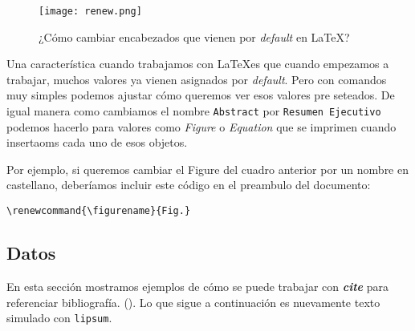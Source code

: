 









 \begin{figure}[H]  
  \centering 
    \texttt{[image: renew.png]}
  \caption{¿Cómo cambiar encabezados que vienen por \textit{default} en \LaTeX ?}
  \label{fig:renew}
\end{figure} 


Una característica cuando trabajamos con  \LaTeX es que cuando empezamos a trabajar, muchos valores ya vienen asignados por \textit{default}. Pero con comandos muy simples podemos ajustar cómo queremos ver esos valores pre seteados. De igual manera como cambiamos el nombre \verb=Abstract= por \verb=Resumen Ejecutivo= podemos hacerlo para valores como \textit{Figure} o \textit{Equation} que se imprimen cuando insertaoms cada uno de esos objetos. 

Por ejemplo, si queremos cambiar el Figure del cuadro anterior por un nombre en castellano, deberíamos incluir este código en el preambulo del documento: 

\verb=\renewcommand{\figurename}{Fig.}= 








\subsection*{Datos} 
 En esta sección mostramos ejemplos de cómo se puede trabajar con \textit{\textbf{cite}} para referenciar bibliografía. 
 (\citealp{dunning_design-based_2010,brady_rethinking_2010,calvo_ballot_2009}).  %
Lo que sigue a continuación es nuevamente texto simulado con \verb=lipsum=.
 
